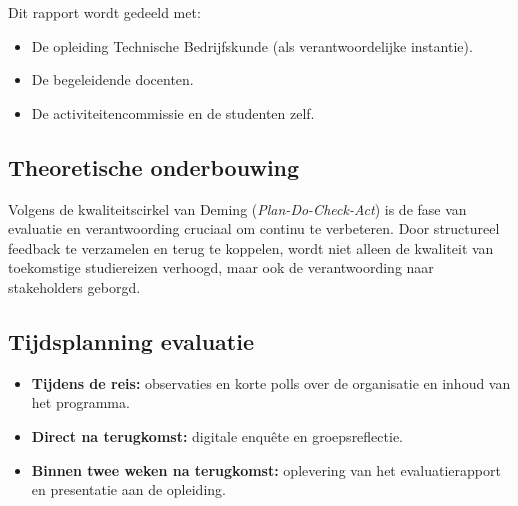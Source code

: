 Dit rapport wordt gedeeld met:
\begin{itemize}
	\item De opleiding Technische Bedrijfskunde (als verantwoordelijke instantie).
	\item De begeleidende docenten.
	\item De activiteitencommissie en de studenten zelf.
\end{itemize}

\subsection{Theoretische onderbouwing}

Volgens de kwaliteitscirkel van Deming (\textit{Plan-Do-Check-Act}) \cite{deming1986out} is de fase van evaluatie en verantwoording cruciaal om continu te verbeteren. Door structureel feedback te verzamelen en terug te koppelen, wordt niet alleen de kwaliteit van toekomstige studiereizen verhoogd, maar ook de verantwoording naar stakeholders geborgd.

\subsection{Tijdsplanning evaluatie}

\begin{itemize}
	\item \textbf{Tijdens de reis:} observaties en korte polls over de organisatie en inhoud van het programma.
	\item \textbf{Direct na terugkomst:} digitale enquête en groepsreflectie.
	\item \textbf{Binnen twee weken na terugkomst:} oplevering van het evaluatierapport en presentatie aan de opleiding.
\end{itemize}